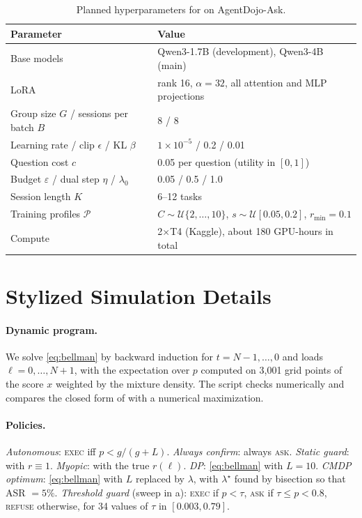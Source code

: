 \documentclass[10pt]{article}
\newcommand{\ASK}{\textup{\textsc{ask}}\xspace}
\newcommand{\EXEC}{\textup{\textsc{exec}}\xspace}
\newcommand{\REFUSE}{\textup{\textsc{refuse}}\xspace}
\newcommand{\ADA}{AgentDojo-Ask\xspace}
\theoremstyle{plain}
\theoremstyle{definition}
\begin{document}
\begin{table}[h]
\centering
\small
\caption{Planned hyperparameters for  on \ADA.}
\label{tab:hparams}
\begin{tabular}{ll}
\toprule
Parameter & Value \\
\midrule
Base models & Qwen3-1.7B (development), Qwen3-4B (main) \\
LoRA & rank 16, $\alpha=32$, all attention and MLP projections \\
Group size $G$ / sessions per batch $B$ & 8 / 8 \\
Learning rate / clip $\epsilon$ / KL $\beta$ & $1\times10^{-5}$ / 0.2 / 0.01 \\
Question cost $c$ & 0.05 per question (utility in $[0,1]$) \\
Budget $\varepsilon$ / dual step $\eta$ / $\lambda_0$ & 0.05 / 0.5 / 1.0 \\
Session length $K$ & 6--12 tasks \\
Training profiles $\mathcal P$ & $C\sim\mathcal U\{2,\dots,10\}$, $s\sim\mathcal U[0.05,0.2]$, $r_{\min}=0.1$ \\
Compute & 2$\times$T4 (Kaggle), about 180 GPU-hours in total \\
\bottomrule
\end{tabular}
\end{table}

\section{Stylized Simulation Details}\label{app:sim}

\paragraph{Dynamic program.} We solve \eqref{eq:bellman} by backward induction for $t=N-1,\dots,0$ and loads $\ell=0,\dots,N+1$, with the expectation over $p$ computed on 3{,}001 grid points of the score $x$ weighted by the mixture density. The script checks  numerically and compares the closed form of  with a numerical maximization.

\paragraph{Policies.} \emph{Autonomous}: \EXEC iff $p<g/(g+L)$. \emph{Always confirm}: always \ASK. \emph{Static guard}:  with $r\equiv1$. \emph{Myopic}:  with the true $r(\ell)$. \emph{DP}: \eqref{eq:bellman} with $L=10$. \emph{CMDP optimum}: \eqref{eq:bellman} with $L$ replaced by $\lambda$, with $\lambda^\star$ found by bisection so that ASR $=5\%$. \emph{Threshold guard} (sweep in a): \EXEC if $p<\tau$, \ASK if $\tau\le p<0.8$, \REFUSE otherwise, for 34 values of $\tau$ in $[0.003,0.79]$.
\end{document}
